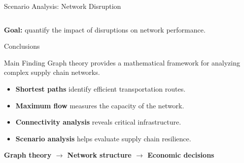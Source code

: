 \documentclass[aspectratio=169]{beamer}
\begin{document}
\begin{frame}{Scenario Analysis: Network Disruption}
\begin{columns}
\begin{center}

\end{center}

\end{columns}

\vspace{0.4cm}

\begin{center}
\textbf{Goal:} quantify the impact of disruptions on network performance.
\end{center}

\end{frame}

\begin{frame}{Conclusions}

\begin{block}{Main Finding}
Graph theory provides a mathematical framework for analyzing complex supply chain networks.
\end{block}

\vspace{0.4cm}

\begin{itemize}

    \item \textbf{Shortest paths} identify efficient transportation routes.

    \item \textbf{Maximum flow} measures the capacity of the network.

    \item \textbf{Connectivity analysis} reveals critical infrastructure.

    \item \textbf{Scenario analysis} helps evaluate supply chain resilience.

\end{itemize}

\vspace{0.5cm}

\begin{center}
\Large
\textbf{Graph theory $\rightarrow$ Network structure $\rightarrow$ Economic decisions}
\end{center}

\end{frame}
\end{document}
